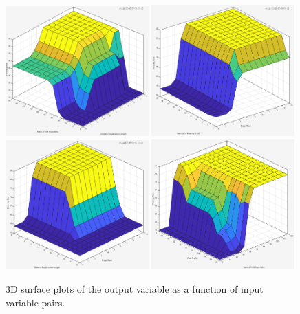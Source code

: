\documentclass{article}
\begin{document}
\begin{figure}[H]
    \centering
    \includegraphics[width=0.49\textwidth]{figures/Surface_NullLinks_DomainReg.png}
    \includegraphics[width=0.49\textwidth]{figures/Surface_CSS_PageRank.png}
    \\
    \includegraphics[width=0.49\textwidth]{figures/Surface_PageRank_DomainReg.png}
    \includegraphics[width=0.49\textwidth]{figures/Surface_WebTraffic_NullLinks.png}
    \caption{3D surface plots of the output variable as a function of input variable pairs.}
    \label{fig:3d_plots}
\end{figure}
\end{document}
